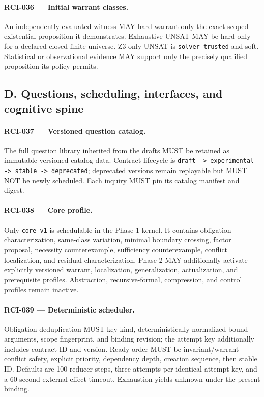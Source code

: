 \documentclass[11pt]{article}
\begin{document}
\paragraph{RCI-036 --- Initial warrant classes.}
An independently evaluated witness MAY hard-warrant only the exact scoped
existential proposition it demonstrates. Exhaustive UNSAT MAY be hard only for
a declared closed finite universe. Z3-only UNSAT is
\texttt{solver\_trusted} and soft. Statistical or observational evidence MAY
support only the precisely qualified proposition its policy permits.

\subsection{D. Questions, scheduling, interfaces, and cognitive spine}

\paragraph{RCI-037 --- Versioned question catalog.}
The full question library inherited from the drafts MUST be retained as
immutable versioned catalog data. Contract lifecycle is
\texttt{draft -> experimental -> stable -> deprecated}; deprecated versions
remain replayable but MUST NOT be newly scheduled. Each inquiry MUST pin its
catalog manifest and digest.

\paragraph{RCI-038 --- Core profile.}
Only \texttt{core-v1} is schedulable in the Phase 1 kernel. It contains
obligation characterization, same-class variation, minimal boundary crossing,
factor proposal, necessity counterexample, sufficiency counterexample,
conflict localization, and residual characterization. Phase 2 MAY additionally
activate explicitly versioned warrant, localization, generalization,
actualization, and prerequisite profiles. Abstraction, recursive-formal,
compression, and control profiles remain inactive.

\paragraph{RCI-039 --- Deterministic scheduler.}
Obligation deduplication MUST key kind, deterministically normalized bound
arguments, scope fingerprint, and binding revision; the attempt key additionally
includes contract ID and version. Ready order MUST be invariant/warrant-conflict
safety, explicit priority, dependency depth, creation sequence, then stable ID.
Defaults are 100 reducer steps, three attempts per identical attempt key, and a
60-second external-effect timeout. Exhaustion yields unknown under the present
binding.
\end{document}

